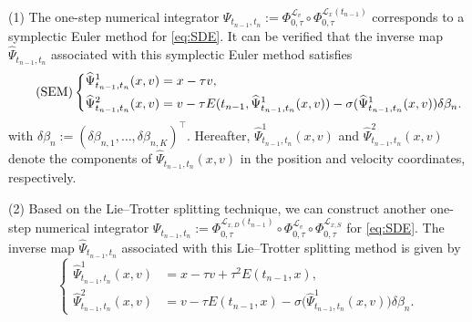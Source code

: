 \documentclass[11pt,reqno]{amsproc}
\numberwithin{equation}{section}
\begin{document}
(1) 
 The one-step numerical integrator 
$\Psi_{t_{n-1},t_n}:=
\Phi^{\mathcal L_{v}}_{0,\tau}\circ
\Phi^{\mathcal L_{x}(t_{n-1})}_{0,\tau}$
corresponds to a symplectic Euler method for \eqref{eq:SDE}. It can be verified that
 the inverse map $\widehat{\Psi}_{t_{n-1},t_n}$ associated with this symplectic Euler method satisfies
\begin{equation}
\label{eq:inv-Phi}\tag{SEM}
		\left\{
		\begin{split}
			\widehat{\Psi}^1_{t_{n-1},t_n}(x,v)&=x-\tau v, \\
			\widehat{\Psi}^2_{t_{n-1},t_n}(x,v)&=v-\tau E(t_{n-1},\widehat{\Psi}^1_{t_{n-1},t_n}(x,v)) - \sigma(\widehat{\Psi}^1_{t_{n-1},t_n}(x,v)) \delta\beta_{n}.
		\end{split}
		\right.\\
\end{equation}
with $\delta\beta_{n}:=(\delta\beta_{n,1},\ldots,\delta\beta_{n,K})^\top$.
 Hereafter, $\widehat{\Psi}^1_{t_{n-1},t_n}(x,v)$ 
and $\widehat{\Psi}^2_{t_{n-1},t_n}(x,v)$ denote the components of $\widehat{\Psi}_{t_{n-1},t_n}(x,v)$ in the position and velocity coordinates, respectively.

(2) Based on the Lie--Trotter splitting technique,
we can construct another one-step numerical integrator 
$\Psi_{t_{n-1},t_n}:=\Phi^{\mathcal{L}_{x,D}(t_{n-1})}_{0,\tau}\circ
\Phi^{\mathcal L_{v}}_{0,\tau}\circ
\Phi^{\mathcal{L}_{x,S}}_{0,\tau}$ for \eqref{eq:SDE}.
 The inverse map $\widehat{\Psi}_{t_{n-1},t_n}$ associated with this Lie--Trotter splitting method is given by
\begin{equation}
\label{eq:inv-LTS}\tag{LTSM}
		\left\{
		\begin{split}
			\widehat{\Psi}^1_{t_{n-1},t_n}(x,v)&=x-\tau v+\tau^2E(t_{n-1},x),\\
			\widehat{\Psi}^2_{t_{n-1},t_n}(x,v)&=v-\tau E(t_{n-1},x)-\sigma\big(\widehat{\Psi}^1_{t_{n-1},t_n}(x,v)\big)\delta\beta_{n}.
		\end{split}
		\right.
\end{equation}
\end{document}
